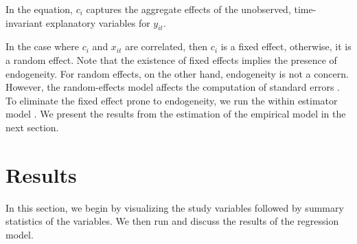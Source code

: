 \documentclass[a4paper,nobind]{templates/ociamthesis}
\begin{document}
In the equation, \(c_{i}\) captures the aggregate effects of the unobserved, time-invariant explanatory variables for \(y_{it}\).

In the case where \(c_{i}\) and \(x_{it}\) are correlated, then \(c_{i}\) is a fixed effect, otherwise, it is a random effect. Note that the existence of fixed effects implies the presence of endogeneity. For random effects, on the other hand, endogeneity is not a concern. However, the random-effects model affects the computation of standard errors \autocite{roberts2013endogeneity}. To eliminate the fixed effect prone to endogeneity, we run the within estimator model \autocite{clark2015should}. We present the results from the estimation of the empirical model in the next section.

\hypertarget{results}{%
\section{\texorpdfstring{\textbf{Results}}{Results}}\label{results}}

In this section, we begin by visualizing the study variables followed by summary statistics of the variables. We then run and discuss the results of the regression model.
\end{document}
